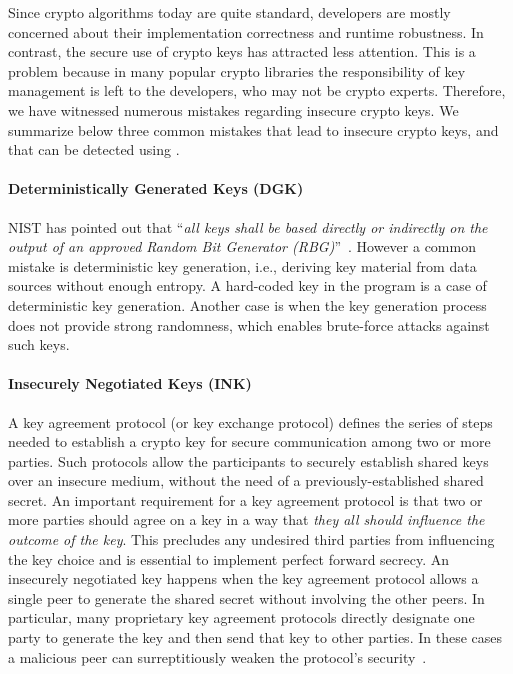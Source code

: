 
Since crypto algorithms today are quite standard, developers are mostly concerned about their implementation correctness and runtime robustness. 
In contrast, the secure use of crypto keys has attracted less attention. 
This is a problem because in many popular crypto libraries the responsibility of key management is left to the developers, who may not be crypto experts. 
Therefore, we have witnessed numerous mistakes regarding insecure crypto keys. 
We summarize below three common mistakes that lead to insecure crypto keys, and that can be detected using \sysname.  

\paragraph{Deterministically Generated Keys (DGK)} 
NIST has pointed out that ``\emph{all keys shall be based directly or indirectly on the output of an approved Random Bit Generator (RBG)}''~\cite{barker2012nist-sp800-133}. However a common mistake is deterministic key generation, i.e., deriving key material from data sources without enough entropy. 
A hard-coded key in the program is a case of deterministic key generation. 
Another case  is when the key generation process does not provide strong randomness, which enables brute-force attacks against such keys.

\paragraph{Insecurely Negotiated Keys (INK)} 
A key agreement protocol (or key exchange protocol) defines the series of steps needed to establish a crypto key for secure communication among two or more parties. 
Such protocols allow the participants to securely establish shared keys over an insecure medium, without the need of a previously-established shared secret. 
An important requirement for a key agreement protocol is that two or more parties should agree on a key in a way that \emph{they all should influence the outcome of the key}. 
This precludes any undesired third parties from influencing the key choice and is essential to implement perfect forward secrecy.
%
An insecurely negotiated key happens when the key agreement protocol allows a single peer to generate the shared secret without involving the other peers. In particular, many proprietary key agreement protocols directly designate one party to generate the key and then send that key to other parties. In these cases a malicious peer can surreptitiously weaken the protocol's security~\cite{keyValidated2017}.

